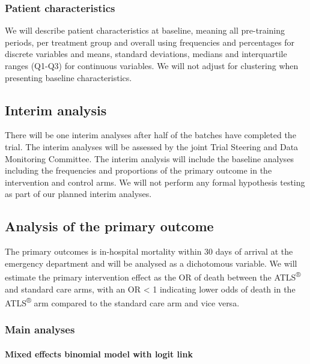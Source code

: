 \documentclass[
]{scrartcl}
\let\oldparagraph\paragraph
\renewcommand{\paragraph}[1]{\oldparagraph{#1}\mbox{}}
\begin{document}
\hypertarget{patient-characteristics}{%
\subsubsection{Patient characteristics}\label{patient-characteristics}}

We will describe patient characteristics at baseline, meaning all
pre-training periods, per treatment group and overall using frequencies
and percentages for discrete variables and means, standard deviations,
medians and interquartile ranges (Q1-Q3) for continuous variables. We
will not adjust for clustering when presenting baseline characteristics.

\hypertarget{interim-analysis}{%
\subsection{Interim analysis}\label{interim-analysis}}

There will be one interim analyses after half of the batches have
completed the trial. The interim analyses will be assessed by the joint
Trial Steering and Data Monitoring Committee. The interim analysis will
include the baseline analyses including the frequencies and proportions
of the primary outcome in the intervention and control arms. We will not
perform any formal hypothesis testing as part of our planned interim
analyses.

\hypertarget{analysis-of-the-primary-outcome}{%
\subsection{Analysis of the primary
outcome}\label{analysis-of-the-primary-outcome}}

The primary outcomes is in-hospital mortality within 30 days of arrival
at the emergency department and will be analysed as a dichotomous
variable. We will estimate the primary intervention effect as the OR of
death between the ATLS\textsuperscript{®} and standard care arms, with
an OR \textless{} 1 indicating lower odds of death in the
ATLS\textsuperscript{®} arm compared to the standard care arm and vice
versa.

\hypertarget{main-analyses}{%
\subsubsection{Main analyses}\label{main-analyses}}

\hypertarget{mixed-effects-binomial-model-with-logit-link}{%
\paragraph{Mixed effects binomial model with logit
link}\label{mixed-effects-binomial-model-with-logit-link}}
\end{document}

